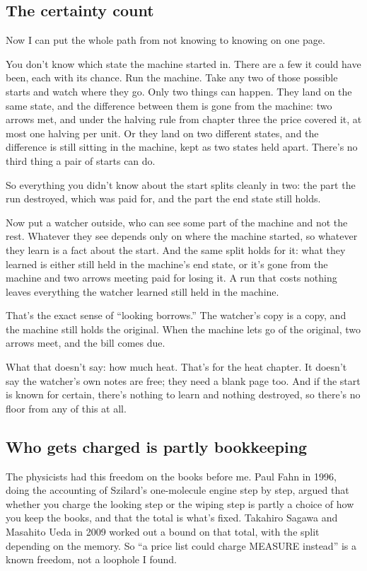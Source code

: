 \documentclass[11pt,twoside]{article}
\theoremstyle{thielethm}
\theoremstyle{thieledef}
\theoremstyle{thieledef}
\theoremstyle{thieledef}
\theoremstyle{thielethm}
\theoremstyle{thieleobs}
\theoremstyle{thielethm}
\begin{document}
\subsection{The certainty count}

Now I can put the whole path from not knowing to knowing on one page.

You don't know which state the machine started in. There are a few it could have been, each with its chance. Run the machine. Take any two of those possible starts and watch where they go. Only two things can happen. They land on the same state, and the difference between them is gone from the machine: two arrows met, and under the halving rule from chapter three the price covered it, at most one halving per unit. Or they land on two different states, and the difference is still sitting in the machine, kept as two states held apart. There's no third thing a pair of starts can do.

So everything you didn't know about the start splits cleanly in two: the part the run destroyed, which was paid for, and the part the end state still holds.

Now put a watcher outside, who can see some part of the machine and not the rest. Whatever they see depends only on where the machine started, so whatever they learn is a fact about the start. And the same split holds for it: what they learned is either still held in the machine's end state, or it's gone from the machine and two arrows meeting paid for losing it. A run that costs nothing leaves everything the watcher learned still held in the machine.

That's the exact sense of ``looking borrows.'' The watcher's copy is a copy, and the machine still holds the original. When the machine lets go of the original, two arrows meet, and the bill comes due.

What that doesn't say: how much heat. That's for the heat chapter. It doesn't say the watcher's own notes are free; they need a blank page too. And if the start is known for certain, there's nothing to learn and nothing destroyed, so there's no floor from any of this at all.

\subsection{Who gets charged is partly bookkeeping}

The physicists had this freedom on the books before me. Paul Fahn in 1996, doing the accounting of Szilard's one-molecule engine step by step, argued that whether you charge the looking step or the wiping step is partly a choice of how you keep the books, and that the total is what's fixed. Takahiro Sagawa and Masahito Ueda in 2009 worked out a bound on that total, with the split depending on the memory. So ``a price list could charge MEASURE instead'' is a known freedom, not a loophole I found.
\end{document}
